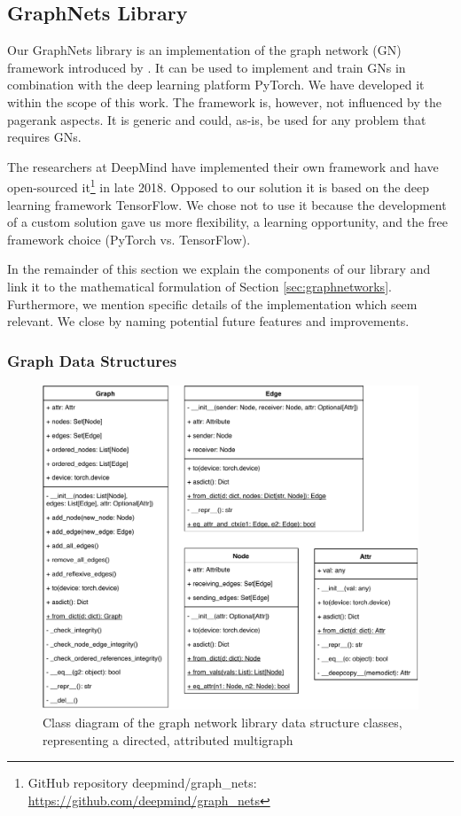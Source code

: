 \subsection{GraphNets Library}
\label{sec:gnlib}

Our GraphNets library is an implementation of the graph network (GN) framework introduced by \cite{deepmind:graphnets}. It can be used to implement and train GNs in combination with the deep learning platform PyTorch. We have developed it within the scope of this work. The framework is, however, not influenced by the pagerank aspects. It is generic and could, as-is, be used for any problem that requires GNs.

The researchers at DeepMind have implemented their own framework and have open-sourced it\footnote{GitHub repository deepmind/graph\_nets: \url{https://github.com/deepmind/graph_nets}} in late 2018. Opposed to our solution it is based on the deep learning framework TensorFlow. We chose not to use it because the development of a custom solution gave us more flexibility, a learning opportunity, and the free framework choice (PyTorch vs. TensorFlow).

In the remainder of this section we explain the components of our library and link it to the mathematical formulation of Section \ref{sec:graphnetworks}. Furthermore, we mention specific details of the implementation which seem relevant. We close by naming potential future features and improvements.

\subsubsection{Graph Data Structures}

\begin{figure}\centering
    \includegraphics[scale=0.65]{resources/graphnets-datastructs}
    \caption[Class diagram of the graph network library data structure classes]{Class diagram of the graph network library data structure classes, representing a directed, attributed multigraph}\label{fig:classdiagramgndatastructs}
\end{figure}

